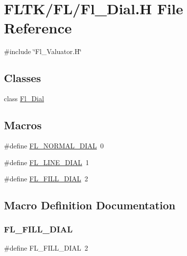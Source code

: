 \hypertarget{_fl___dial_8_h}{}\section{F\+L\+T\+K/\+F\+L/\+Fl\+\_\+\+Dial.H File Reference}
\label{_fl___dial_8_h}
{\ttfamily \#include \char`\"{}Fl\+\_\+\+Valuator.\+H\char`\"{}}\newline
\subsection*{Classes}
\begin{DoxyCompactItemize}
\item 
class \hyperlink{class_fl___dial}{Fl\+\_\+\+Dial}
\end{DoxyCompactItemize}
\subsection*{Macros}
\begin{DoxyCompactItemize}
\item 
\#define \hyperlink{_fl___dial_8_h_a00e96e4fcd946b8086b8fa8c8309ff68}{F\+L\+\_\+\+N\+O\+R\+M\+A\+L\+\_\+\+D\+I\+AL}~0
\item 
\#define \hyperlink{_fl___dial_8_h_a182625da902e7fbce6ad158a8d212cb9}{F\+L\+\_\+\+L\+I\+N\+E\+\_\+\+D\+I\+AL}~1
\item 
\#define \hyperlink{_fl___dial_8_h_a3e57082a1425d2f55d741d2214fd4552}{F\+L\+\_\+\+F\+I\+L\+L\+\_\+\+D\+I\+AL}~2
\end{DoxyCompactItemize}


\subsection{Macro Definition Documentation}
\mbox{\label{_fl___dial_8_h_a3e57082a1425d2f55d741d2214fd4552}} 
\subsubsection{\texorpdfstring{F\+L\+\_\+\+F\+I\+L\+L\+\_\+\+D\+I\+AL}{FL\_FILL\_DIAL}}
{\footnotesize\ttfamily \#define F\+L\+\_\+\+F\+I\+L\+L\+\_\+\+D\+I\+AL~2}

